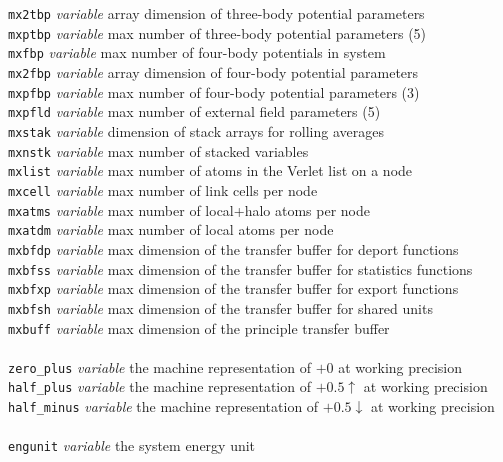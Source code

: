 \begin{tabbing}
\> {\tt mx2tbp}      \> {\em variable}       \> array dimension of three-body potential parameters \\
\> {\tt mxptbp}      \> {\em variable}       \> max number of three-body potential parameters (5) \\
\> {\tt mxfbp}       \> {\em variable}       \> max number of four-body potentials in system \\
\> {\tt mx2fbp}      \> {\em variable}       \> array dimension of four-body potential parameters \\
\> {\tt mxpfbp}      \> {\em variable}       \> max number of four-body potential parameters (3) \\
\> {\tt mxpfld}      \> {\em variable}       \> max number of external field parameters (5) \\
\> {\tt mxstak}      \> {\em variable}       \> dimension of stack arrays for rolling averages \\
\> {\tt mxnstk}      \> {\em variable}       \> max number of stacked variables \\
\> {\tt mxlist}      \> {\em variable}       \> max number of atoms in the Verlet list on a node \\
\> {\tt mxcell}      \> {\em variable}       \> max number of link cells per node \\
\> {\tt mxatms}      \> {\em variable}       \> max number of local+halo atoms per node \\
\> {\tt mxatdm}      \> {\em variable}       \> max number of local atoms per node \\
\> {\tt mxbfdp}      \> {\em variable}       \> max dimension of the transfer buffer for deport functions \\
\> {\tt mxbfss}      \> {\em variable}       \> max dimension of the transfer buffer for statistics functions \\
\> {\tt mxbfxp}      \> {\em variable}       \> max dimension of the transfer buffer for export functions \\
\> {\tt mxbfsh}      \> {\em variable}       \> max dimension of the transfer buffer for shared units \\
\> {\tt mxbuff}      \> {\em variable}       \> max dimension of the principle transfer buffer \\
\>                   \>                      \> \\
\> {\tt zero\_plus}  \> {\em variable}       \> the machine representation of $+0$ at working precision \\
\> {\tt half\_plus}  \> {\em variable}       \> the machine representation of $+0.5\uparrow$ at working precision \\
\> {\tt half\_minus} \> {\em variable}       \> the machine representation of $+0.5\downarrow$ at working precision \\
\>                   \>                      \> \\
\> {\tt engunit}     \> {\em variable}       \> the system energy unit \\
\end{tabbing}
